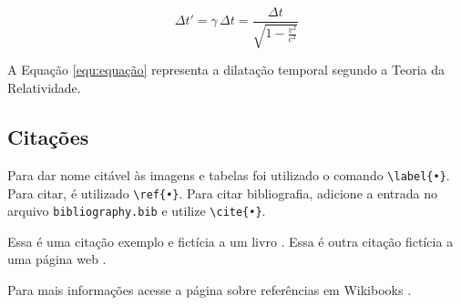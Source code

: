 \documentclass[11pt,a4paper]{article}
\begin{document}
\begin{equation} \label{equ:equação}
\Delta t' = \gamma \, \Delta t = \frac{\Delta t}{\sqrt{1-\frac{v^2}{c^2}}}
\end{equation}

A Equação \ref{equ:equação} representa a dilatação temporal segundo a Teoria da Relatividade.

\subsection{Citações}

Para dar nome citável às imagens e tabelas foi utilizado o comando \verb!\label{•}!. Para citar, é utilizado \verb!\ref{•}!. Para citar bibliografia, adicione a entrada no arquivo \texttt{bibliography.bib} e utilize \verb!\cite{•}!.

Essa é uma citação exemplo e fictícia a um livro \cite{SIAM}. Essa é outra citação fictícia a uma página web \cite{wiki}.

Para mais informações acesse a página sobre referências em Wikibooks \cite{latex}.

\newpage


\end{document}
